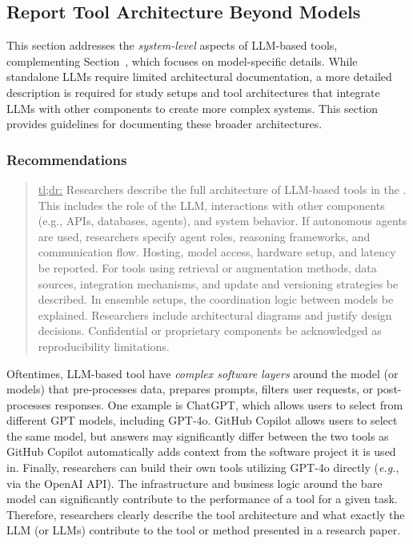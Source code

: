 



\subsection{Report Tool Architecture Beyond Models}

This section addresses the \emph{system-level} aspects of LLM-based tools, complementing Section~\modelversion, which focuses on model-specific details.
While standalone LLMs require limited architectural documentation, a more detailed description is required for study setups and tool architectures that integrate LLMs with other components to create more complex systems.
This section provides guidelines for documenting these broader architectures.

\subsubsection{Recommendations}

\begin{quote}
\underline{tl;dr:} Researchers \must describe the full architecture of LLM-based tools in the \paper. This includes the role of the LLM, interactions with other components (e.g., APIs, databases, agents), and system behavior. If autonomous agents are used, researchers \must specify agent roles, reasoning frameworks, and communication flow. Hosting, model access, hardware setup, and latency \must be reported. For tools using retrieval or augmentation methods, data sources, integration mechanisms, and update and versioning strategies \must be described. In ensemble setups, the coordination logic between models \must be explained. Researchers \should include architectural diagrams and justify design decisions. Confidential or proprietary components \must be acknowledged as reproducibility limitations.
\end{quote}

Oftentimes, LLM-based tool have \emph{complex software layers} around the model (or models) that pre-processes data, prepares prompts, filters user requests, or post-processes responses.
One example is ChatGPT, which allows users to select from different GPT models, including GPT-4o.
GitHub Copilot allows users to select the same model, but answers may significantly differ between the two tools as GitHub Copilot automatically adds context from the software project it is used in.
Finally, researchers can build their own tools utilizing GPT-4o directly (\textit{e.g.}, via the OpenAI API).
The infrastructure and business logic around the bare model can significantly contribute to the performance of a tool for a given task.
Therefore, researchers \must clearly describe the tool architecture and what exactly the LLM (or LLMs) contribute to the tool or method presented in a research paper.

